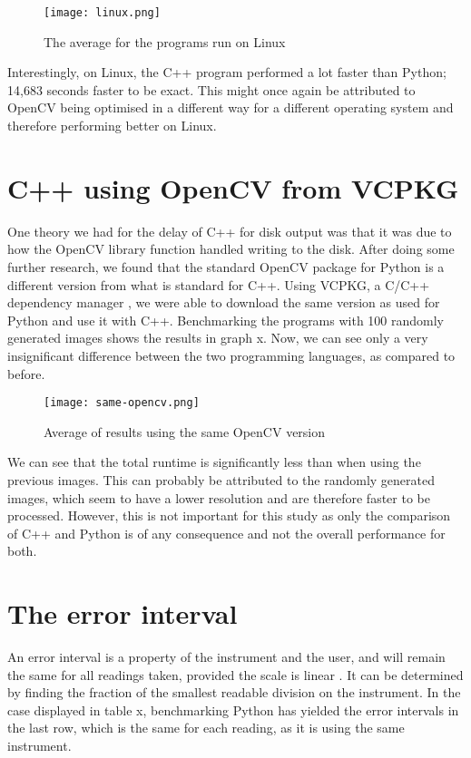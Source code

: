 \begin{figure}[H]
	\centering
	\texttt{[image: linux.png]}
	\caption{The average for the programs run on Linux}
	\label{figure:linux}
\end{figure}

Interestingly, on Linux, the C++ program performed a lot faster than Python; 14,683 seconds faster to be exact. This might once again be attributed to OpenCV being optimised in a different way for a different operating system and therefore performing better on Linux.

\section{C++ using OpenCV from VCPKG}
One theory we had for the delay of C++ for disk output was that it was due to how the OpenCV library function handled writing to the disk. After doing some further research, we found that the standard OpenCV package for Python is a different version from what is standard for C++. Using VCPKG, a C/C++ dependency manager \cite{vcpkg}, we were able to download the same version as used for Python and use it with C++. Benchmarking the programs with 100 randomly generated images shows the results in graph x. Now, we can see only a very insignificant difference between the two programming languages, as compared to before.

\begin{figure}[H]
	\centering
	\texttt{[image: same-opencv.png]}
	\caption{Average of results using the same OpenCV version}
	\label{figure:same-opencv}
\end{figure}

We can see that the total runtime is significantly less than when using the previous images. This can probably be attributed to the randomly generated images, which seem to have a lower resolution and are therefore faster to be processed. However, this is not important for this study as only the comparison of C++ and Python is of any consequence and not the overall performance for both.

\section{The error interval}
An error interval is a property of the instrument and the user, and will remain the same for all readings taken, provided the scale is linear \cite{errorinterval}. It can be determined by finding the fraction of the smallest readable division on the instrument. In the case displayed in table x, benchmarking Python has yielded the error intervals in the last row, which is the same for each reading, as it is using the same instrument.

